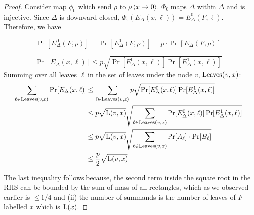 \begin{proof}
    Consider map $\phi_0$ which send $\rho$ to $\rho\left\langle x \to 0 \right\rangle$. $\Phi_0$ maps $\Delta$ within $\Delta$ and is injective.
    Since $\Delta$ is downward closed, $\Phi_0(E_\Delta(x,\ell)) = E^0_\Delta(F,\ell)$. Therefore, we have 

    $$\Pr[E^0_\Delta(F,\rho)] = \Pr[E^1_\Delta(F,\rho)]= p \cdot \Pr[E_\Delta(F,\rho)]$$

    $$\Pr[E_\Delta(x,\ell)] \le p \sqrt{\Pr[E^0_\Delta(x,\ell)] \Pr[E^1_\Delta(x,\ell)]}$$
    Summing over all leaves $\ell$ in the set of leaves under the node $v$,  $\operatorname{\operatorname{Leaves}}(v,x)$:
    \begin{align*}
        \sum_{\ell \in \operatorname{\operatorname{Leaves}}(v,x)} \Pr[E_\Delta(x,\ell)] 
        &\le \sum_{\ell \in \operatorname{\operatorname{Leaves}}(v,x)}p \sqrt{\Pr[E^0_\Delta(x,\ell)] \Pr[E^1_\Delta(x,\ell)]}\\
        &\le p \sqrt{\mathrm{L}(v,x)} \sqrt{\sum_{\ell \in \operatorname{\operatorname{Leaves}}(v,x)} \Pr[E^0_\Delta(x,\ell)] \Pr[E^1_\Delta(x,\ell)]} \\
        &\le p\sqrt{{\mathrm{L}(v,x)}} \sqrt{\sum_{\ell \in \operatorname{\operatorname{Leaves}}(v,x)}\Pr[A_\ell]\cdot \Pr[B_\ell]}\\
        &\le \frac{p}2\sqrt{\mathrm{L}(v,x)}        
    \end{align*}


    The last inequality follows because, the second term inside the square root in the RHS can be bounded by the sum of mass of all rectangles, which as we observed earlier is $\le 1/4$ and (ii) the number of summands is the number of leaves of $F$ labelled $x$ which is $\mathrm{L}(x)$. 
\end{proof}




